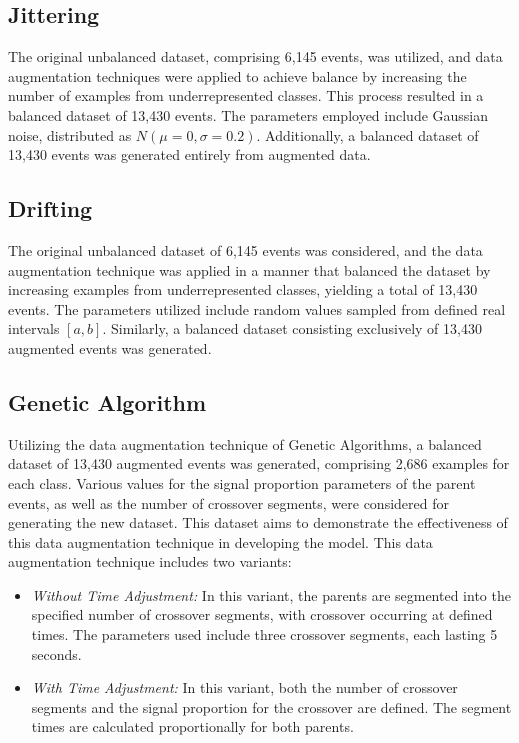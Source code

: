 \documentclass[lettersize,journal]{IEEEtran}
\begin{document}
\subsection{Jittering}
\noindent The original unbalanced dataset, comprising 6,145 events, was utilized, and data augmentation techniques were applied to achieve balance by increasing the number of examples from underrepresented classes. This process resulted in a balanced dataset of 13,430 events.
The parameters employed include Gaussian noise, distributed as \(N(\mu=0,\sigma=0.2)\). Additionally, a balanced dataset of 13,430 events was generated entirely from augmented data.
\subsection{Drifting}
\noindent The original unbalanced dataset of 6,145 events was considered, and the data augmentation technique was applied in a manner that balanced the dataset by increasing examples from underrepresented classes, yielding a total of 13,430 events.
The parameters utilized include random values sampled from defined real intervals \([a,b]\). Similarly, a balanced dataset consisting exclusively of 13,430 augmented events was generated.
\subsection{Genetic Algorithm}
\noindent Utilizing the data augmentation technique of Genetic Algorithms, a balanced dataset of 13,430 augmented events was generated, comprising 2,686 examples for each class. Various values for the signal proportion parameters of the parent events, as well as the number of crossover segments, were considered for generating the new dataset. This dataset aims to demonstrate the effectiveness of this data augmentation technique in developing the model.
This data augmentation technique includes two variants:
\begin{itemize}
  \item \textit{Without Time Adjustment:} In this variant, the parents are segmented into the specified number of crossover segments, with crossover occurring at defined times. The parameters used include three crossover segments, each lasting 5 seconds.
  \item \textit{With Time Adjustment:} In this variant, both the number of crossover segments and the signal proportion for the crossover are defined. The segment times are calculated proportionally for both parents.
\end{itemize}
\end{document}
